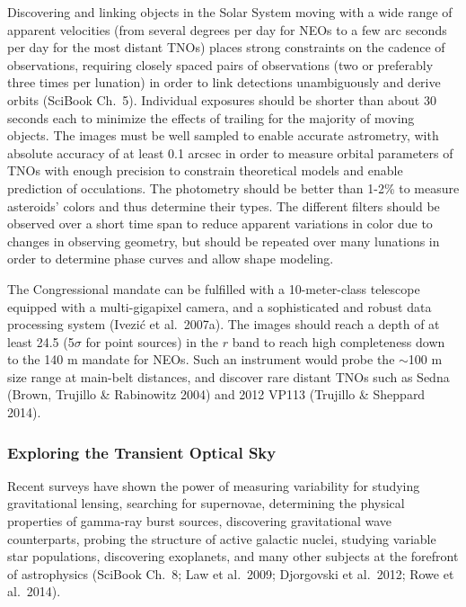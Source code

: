 Discovering and linking objects in the Solar System moving with a wide range of apparent velocities (from
several degrees per day for NEOs to a few arc seconds per day for the most distant TNOs) places strong
constraints on the cadence of observations, requiring closely spaced pairs of observations (two or preferably
three times per lunation) in order to link detections unambiguously and derive orbits (SciBook Ch.~5). Individual
exposures should be shorter than about 30 seconds each to minimize the effects of trailing for the majority of
moving objects. The images must be well sampled to enable accurate astrometry, with absolute accuracy of at
least 0.1 arcsec in order to measure orbital parameters of TNOs with enough precision to constrain theoretical
models and enable prediction of occulations. The photometry should be
better than 1-2\% to measure asteroids' colors and thus determine
their types.  The different filters
should be observed over a short time span to reduce apparent
variations in color due to changes in observing geometry, but should
be repeated over many lunations in order to determine phase curves and allow shape modeling.

The Congressional mandate can be fulfilled with a 10-meter-class
telescope equipped with a multi-gigapixel camera, and a sophisticated
and robust data processing system (Ivezi\'{c} et al.~2007a). The images should reach a depth of at
least 24.5 (5$\sigma$ for point sources) in the $r$ band to reach high
completeness down to the 140 m mandate for NEOs.  Such an instrument
would probe the $\sim$100 m size range at main-belt distances, and
discover rare distant TNOs such as Sedna (Brown, Trujillo \&
Rabinowitz 2004) and 2012 VP113 (Trujillo \& Sheppard 2014).


\subsubsection{ Exploring the Transient Optical Sky}

Recent surveys have shown the power of measuring variability for
studying gravitational lensing, searching for supernovae, determining
the physical properties of gamma-ray burst sources, discovering
gravitational wave counterparts, probing the structure of active
galactic nuclei, studying variable star populations, discovering
exoplanets, and many other subjects at the forefront of astrophysics
(SciBook Ch.~8; Law et al.~2009; Djorgovski et al.~2012; Rowe et
al.~2014).

